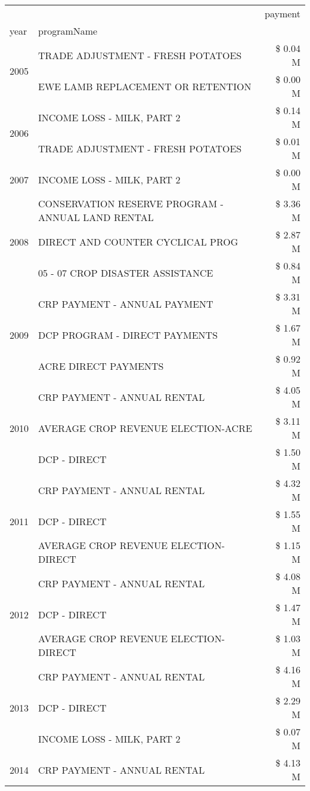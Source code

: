 \begin{tabular}{llr}
\toprule
 &  & payment \\
year & programName &  \\
\midrule
\multirow[t]{2}{*}{2005} & TRADE ADJUSTMENT - FRESH POTATOES & \$ 0.04 M \\
 & EWE LAMB REPLACEMENT OR RETENTION & \$ 0.00 M \\
\cline{1-3}
\multirow[t]{2}{*}{2006} & INCOME LOSS - MILK, PART 2 & \$ 0.14 M \\
 & TRADE ADJUSTMENT - FRESH POTATOES & \$ 0.01 M \\
\cline{1-3}
2007 & INCOME LOSS - MILK, PART 2 & \$ 0.00 M \\
\cline{1-3}
\multirow[t]{3}{*}{2008} & CONSERVATION RESERVE PROGRAM - ANNUAL LAND RENTAL & \$ 3.36 M \\
 & DIRECT AND COUNTER CYCLICAL PROG & \$ 2.87 M \\
 & 05 - 07 CROP DISASTER ASSISTANCE & \$ 0.84 M \\
\cline{1-3}
\multirow[t]{3}{*}{2009} & CRP PAYMENT - ANNUAL PAYMENT & \$ 3.31 M \\
 & DCP PROGRAM - DIRECT PAYMENTS & \$ 1.67 M \\
 & ACRE DIRECT PAYMENTS & \$ 0.92 M \\
\cline{1-3}
\multirow[t]{3}{*}{2010} & CRP PAYMENT - ANNUAL RENTAL & \$ 4.05 M \\
 & AVERAGE CROP REVENUE ELECTION-ACRE & \$ 3.11 M \\
 & DCP - DIRECT & \$ 1.50 M \\
\cline{1-3}
\multirow[t]{3}{*}{2011} & CRP PAYMENT - ANNUAL RENTAL & \$ 4.32 M \\
 & DCP - DIRECT & \$ 1.55 M \\
 & AVERAGE CROP REVENUE ELECTION-DIRECT & \$ 1.15 M \\
\cline{1-3}
\multirow[t]{3}{*}{2012} & CRP PAYMENT - ANNUAL RENTAL & \$ 4.08 M \\
 & DCP - DIRECT & \$ 1.47 M \\
 & AVERAGE CROP REVENUE ELECTION-DIRECT & \$ 1.03 M \\
\cline{1-3}
\multirow[t]{3}{*}{2013} & CRP PAYMENT - ANNUAL RENTAL & \$ 4.16 M \\
 & DCP - DIRECT & \$ 2.29 M \\
 & INCOME LOSS - MILK, PART 2 & \$ 0.07 M \\
\cline{1-3}
\multirow[t]{3}{*}{2014} & CRP PAYMENT - ANNUAL RENTAL & \$ 4.13 M \\

\end{tabular}
